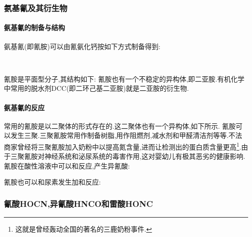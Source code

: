 \documentclass{ctexart}
\begin{document}
\subsubsection{氨基氰及其衍生物}
\paragraph{氨基氰的制备与结构}
氨基氰(即氰胺)可以由氰氨化钙按如下方式制备得到:
\begin{center}
    \\
\end{center}
氰胺是平面型分子,其结构如下:
氰胺也有一个不稳定的异构体,即二亚胺.有机化学中常用的脱水剂DCC(即二环己基二亚胺)就是二亚胺的衍生物.
\paragraph{氨基氰的反应}
\indent 常用的氰胺是以二聚体的形式存在的.这二聚体也有一个异构体,如下所示.
氰胺可以发生三聚.三聚氰胺常用作制备树脂,用作阻燃剂,减水剂和甲醛清洁剂等等.不法商家曾经将三聚氰胺加入奶粉中以提高氮含量,进而让检测出的蛋白质含量更高\footnote{这就是曾经轰动全国的著名的三鹿奶粉事件.}.由于三聚氰胺对神经系统和泌尿系统的毒害作用,这对婴幼儿有极其恶劣的健康影响.
氰胺在酸性溶液中可以和反应,产生异氰酸:
\begin{center}
\end{center}
氰胺也可以和尿素发生加和反应:
\begin{center}
\end{center}
\subsubsection{氰酸HOCN,异氰酸HNCO和雷酸HONC}
\end{document}
